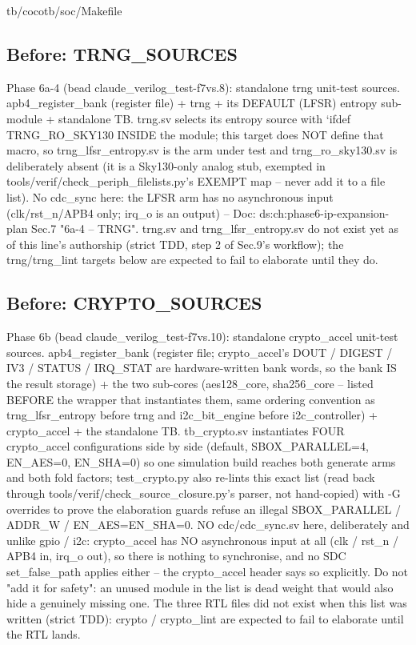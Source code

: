 \begin{relocated}{tb/cocotb/soc/Makefile}
\subsection*{Before: TRNG\_SOURCES}

\begin{textblock}
Phase 6a-4 (bead claude_verilog_test-f7vs.8): standalone trng unit-test sources.
apb4_register_bank (register file) + trng + its DEFAULT (LFSR) entropy sub-module + standalone
TB. trng.sv selects its entropy source with `ifdef TRNG_RO_SKY130 INSIDE the module; this target
does NOT define that macro, so trng_lfsr_entropy.sv is the arm under test and
trng_ro_sky130.sv is deliberately absent (it is a Sky130-only analog stub, exempted in
tools/verif/check_periph_filelists.py's EXEMPT map -- never add it to a file list). No
cdc_sync here: the LFSR arm has no asynchronous input (clk/rst_n/APB4 only; irq_o is an
output) -- Doc: ds:ch:phase6-ip-expansion-plan Sec.7 "6a-4 -- TRNG". trng.sv and
trng_lfsr_entropy.sv do not exist yet as of this line's authorship (strict TDD, step 2 of
Sec.9's workflow); the trng/trng_lint targets below are expected to fail to elaborate until they
do.
\end{textblock}

\subsection*{Before: CRYPTO\_SOURCES}

\begin{textblock}
Phase 6b (bead claude_verilog_test-f7vs.10): standalone crypto_accel unit-test sources.
apb4_register_bank (register file; crypto_accel's DOUT / DIGEST / IV3 / STATUS / IRQ_STAT are
hardware-written bank words, so the bank IS the result storage) + the two sub-cores
(aes128_core, sha256_core -- listed BEFORE the wrapper that instantiates them, same ordering
convention as trng_lfsr_entropy before trng and i2c_bit_engine before i2c_controller) +
crypto_accel + the standalone TB. tb_crypto.sv instantiates FOUR crypto_accel configurations
side by side (default, SBOX_PARALLEL=4, EN_AES=0, EN_SHA=0) so one simulation build reaches both
generate arms and both fold factors; test_crypto.py also re-lints this exact list (read back
through tools/verif/check_source_closure.py's parser, not hand-copied) with -G overrides to
prove the elaboration guards refuse an illegal SBOX_PARALLEL / ADDR_W / EN_AES=EN_SHA=0.
NO cdc/cdc_sync.sv here, deliberately and unlike gpio / i2c: crypto_accel has NO
asynchronous input at all (clk / rst_n / APB4 in, irq_o out), so there is nothing to
synchronise, and no SDC set_false_path applies either -- the crypto_accel header says so
explicitly. Do not "add it for safety": an unused module in the list is dead weight that would
also hide a genuinely missing one. The three RTL files did not exist when this list was written
(strict TDD): crypto / crypto_lint are expected to fail to elaborate until the RTL lands.
\end{textblock}


\end{relocated}
